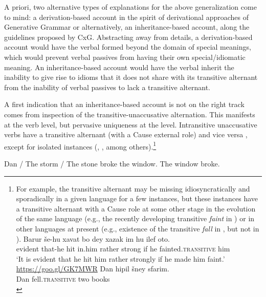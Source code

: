 \documentclass[output=paper,
modfonts
]{LSP/langsci}
\begin{document}
A priori, two alternative types of explanations for the above
generalization come to mind: a derivation-based account in the spirit of
derivational approaches of Generative Grammar or alternatively, an
inheritance-based account, along the guidelines proposed by CxG.
Abstracting away from details, a derivation-based account would have the
verbal  formed beyond the domain of special meanings, which would
prevent verbal passives from having their own special/idiomatic meaning.
An inheritance-based account would have the verbal  inherit the
inability to give rise to idioms that it does not share with its
transitive alternant from the inability of verbal passives to lack a
transitive alternant.

A first indication that an inheritance-based account is not on the right
track comes from inspection of the transitive-unaccusative alternation.
This  manifests  at the verb level, but pervasive
uniqueness at the  level. Intransitive unaccusative verbs have a
transitive alternant (with a Cause external role) and vice versa ,
except for isolated instances (\citealt{haertl2003}, \citealt{reinhart2002}, among
others).\footnote{For example, the transitive alternant may be missing
idiosyncratically and sporadically in a given language for a few
instances, but these instances have a transitive alternant with a
Cause role at some other stage in the evolution of the same language
(e.g., the recently developing transitive \emph{faint} in  )
or in other languages at present (e.g., existence of the transitive
\emph{fall} in  , but not in ).
\ea \label{ex:horvath:fn81}
\gll Barur še-hu xavat bo dey xazak im hu ilef oto.\\
	evident that-he hit in.him rather strong if he fainted.\textsc{transitive} him\\
	\glt `It is evident that he hit him rather strongly if he made him faint.'\\
	\hfill \url{https://goo.gl/GK7MWR}
\ex \label{ex:horvath:fn82} \gll Dan hipil šney sfarim.\\
	Dan fell.\textsc{transitive} two books\\
\z
}

\ea \label{ex:horvath:13}
	\ea \label{ex:horvath:13a} Dan / The storm / The stone broke the window.
	\ex \label{ex:horvath:13b} The window broke.
	\z
\z
\end{document}
